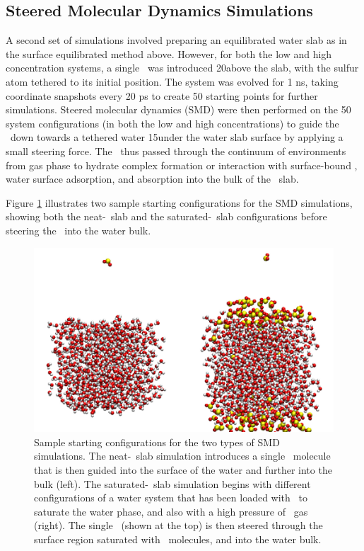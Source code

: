 \subsection{Steered Molecular Dynamics Simulations}

A second set of simulations involved preparing an equilibrated water slab as in the surface equilibrated method above. However, for both the low and high concentration systems, a single \suldiox~was introduced 20\angs above the slab, with the sulfur atom tethered to its initial position. The system was evolved for 1 ns, taking coordinate snapshots every 20 ps to create 50 starting points for further simulations. Steered molecular dynamics (SMD) were then performed on the 50 system configurations (in both the low and high concentrations) to guide the \suldiox~down towards a tethered water 15\angs under the water slab surface by applying a small steering force.\cite{Isralewitz2001} The \suldiox~thus passed through the continuum of environments from gas phase to hydrate complex formation or interaction with surface-bound \suldiox, water surface adsorption, and absorption into the bulk of the \wat~slab. 

Figure \ref{fig:starting-configurations} illustrates two sample starting configurations for the SMD simulations, showing both the neat-\wat~slab and the saturated-\wat~slab configurations before steering the \suldiox~into the water bulk.

\begin{figure}[h!]
	\begin{center}
		\includegraphics[scale=1.0]{images/startingconfigurations.png}
		\caption{Sample starting configurations for the two types of SMD simulations. The neat-\wat~slab simulation introduces a single \suldiox~molecule that is then guided into the surface of the water and further into the bulk (left). The saturated-\wat~slab simulation begins with different configurations of a water system that has been loaded with \suldiox~to saturate the water phase, and also with a high pressure of \suldiox~gas (right). The single \suldiox~(shown at the top) is then steered through the surface region saturated with \suldiox~molecules, and into the water bulk.}
		\label{fig:starting-configurations}
	\end{center}
\end{figure}
